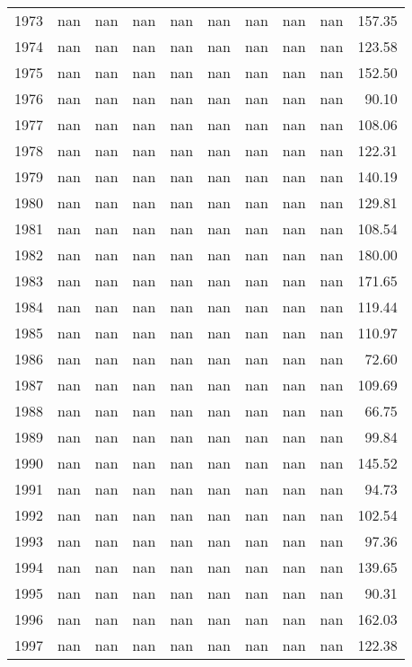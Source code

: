 \begin{tabular}{lrrrrrrrrr}
1973 & nan & nan & nan & nan & nan & nan & nan & nan & 157.35 \\
1974 & nan & nan & nan & nan & nan & nan & nan & nan & 123.58 \\
1975 & nan & nan & nan & nan & nan & nan & nan & nan & 152.50 \\
1976 & nan & nan & nan & nan & nan & nan & nan & nan & 90.10 \\
1977 & nan & nan & nan & nan & nan & nan & nan & nan & 108.06 \\
1978 & nan & nan & nan & nan & nan & nan & nan & nan & 122.31 \\
1979 & nan & nan & nan & nan & nan & nan & nan & nan & 140.19 \\
1980 & nan & nan & nan & nan & nan & nan & nan & nan & 129.81 \\
1981 & nan & nan & nan & nan & nan & nan & nan & nan & 108.54 \\
1982 & nan & nan & nan & nan & nan & nan & nan & nan & 180.00 \\
1983 & nan & nan & nan & nan & nan & nan & nan & nan & 171.65 \\
1984 & nan & nan & nan & nan & nan & nan & nan & nan & 119.44 \\
1985 & nan & nan & nan & nan & nan & nan & nan & nan & 110.97 \\
1986 & nan & nan & nan & nan & nan & nan & nan & nan & 72.60 \\
1987 & nan & nan & nan & nan & nan & nan & nan & nan & 109.69 \\
1988 & nan & nan & nan & nan & nan & nan & nan & nan & 66.75 \\
1989 & nan & nan & nan & nan & nan & nan & nan & nan & 99.84 \\
1990 & nan & nan & nan & nan & nan & nan & nan & nan & 145.52 \\
1991 & nan & nan & nan & nan & nan & nan & nan & nan & 94.73 \\
1992 & nan & nan & nan & nan & nan & nan & nan & nan & 102.54 \\
1993 & nan & nan & nan & nan & nan & nan & nan & nan & 97.36 \\
1994 & nan & nan & nan & nan & nan & nan & nan & nan & 139.65 \\
1995 & nan & nan & nan & nan & nan & nan & nan & nan & 90.31 \\
1996 & nan & nan & nan & nan & nan & nan & nan & nan & 162.03 \\
1997 & nan & nan & nan & nan & nan & nan & nan & nan & 122.38 \\

\end{tabular}
